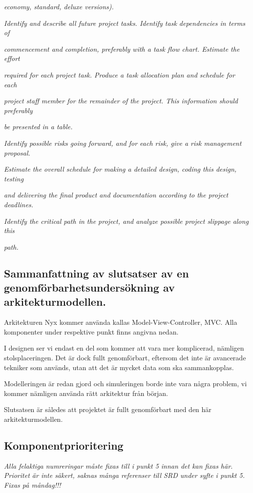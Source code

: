 \documentclass[a4paper, twoside, 11pt, titlepage]{article}
\begin{document}
\emph{economy, standard, deluxe versions).}

\emph{Identify and describe all future project tasks. Identify task dependencies in terms of}

\emph{commencement and completion, preferably with a task flow chart. Estimate the effort}

\emph{required for each project task. Produce a task allocation plan and schedule for each}

\emph{project staff member for the remainder of the project. This information should preferably}

\emph{be presented in a table.}

\emph{Identify possible risks going forward, and for each risk, give a risk management proposal.}

\emph{Estimate the overall schedule for making a detailed design, coding this design, testing}

\emph{and delivering the final product and documentation according to the project deadlines.}

\emph{Identify the critical path in the project, and analyze possible project slippage along this}

\emph{path.}

	\subsection{Sammanfattning av slutsatser av en genomförbarhetsundersökning av arkitekturmodellen.}


	Arkitekturen Nyx kommer använda kallas Model-View-Controller, MVC. Alla komponenter under respektive punkt finns angivna nedan.

	I designen ser vi endast en del som kommer att vara mer komplicerad, nämligen stolsplaceringen. Det är dock fullt genomförbart, eftersom det inte är avancerade tekniker som används, utan att det är mycket data som ska sammankopplas.

	Modelleringen är redan gjord och simuleringen borde inte vara några problem, vi kommer nämligen använda rätt arkitektur från början.

	Slutsatsen är således att projektet är fullt genomförbart med den här arkitekturmodellen.

	\subsection{Komponentprioritering}


	\emph{Alla felaktiga numreringar måste fixas till i punkt 5 innan det kan fixas här. Prioritet är inte säkert, saknas många referenser till SRD under syfte i punkt 5. Fixas på måndag!!!}
\end{document}
